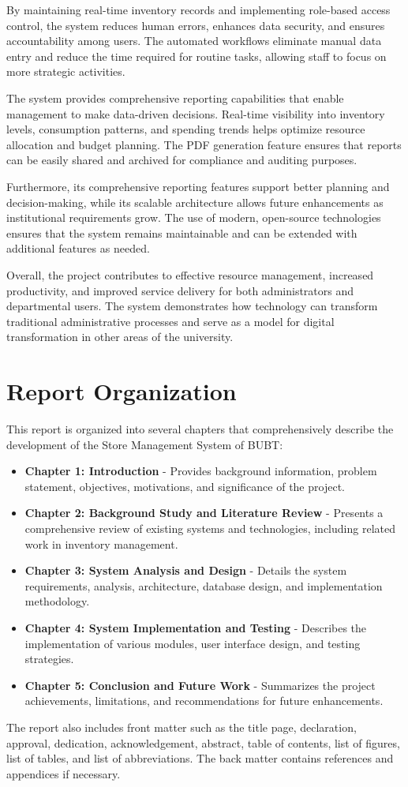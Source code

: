 By maintaining real-time inventory records and implementing role-based access control, the system reduces human errors, enhances data security, and ensures accountability among users. The automated workflows eliminate manual data entry and reduce the time required for routine tasks, allowing staff to focus on more strategic activities.

The system provides comprehensive reporting capabilities that enable management to make data-driven decisions. Real-time visibility into inventory levels, consumption patterns, and spending trends helps optimize resource allocation and budget planning. The PDF generation feature ensures that reports can be easily shared and archived for compliance and auditing purposes.

Furthermore, its comprehensive reporting features support better planning and decision-making, while its scalable architecture allows future enhancements as institutional requirements grow. The use of modern, open-source technologies ensures that the system remains maintainable and can be extended with additional features as needed.

Overall, the project contributes to effective resource management, increased productivity, and improved service delivery for both administrators and departmental users. The system demonstrates how technology can transform traditional administrative processes and serve as a model for digital transformation in other areas of the university.

\section{Report Organization}

This report is organized into several chapters that comprehensively describe the development of the Store Management System of BUBT:

\begin{itemize}
    \item \textbf{Chapter 1: Introduction} - Provides background information, problem statement, objectives, motivations, and significance of the project.

    \item \textbf{Chapter 2: Background Study and Literature Review} - Presents a comprehensive review of existing systems and technologies, including related work in inventory management.

    \item \textbf{Chapter 3: System Analysis and Design} - Details the system requirements, analysis, architecture, database design, and implementation methodology.

    \item \textbf{Chapter 4: System Implementation and Testing} - Describes the implementation of various modules, user interface design, and testing strategies.

    \item \textbf{Chapter 5: Conclusion and Future Work} - Summarizes the project achievements, limitations, and recommendations for future enhancements.
\end{itemize}

The report also includes front matter such as the title page, declaration, approval, dedication, acknowledgement, abstract, table of contents, list of figures, list of tables, and list of abbreviations. The back matter contains references and appendices if necessary.
